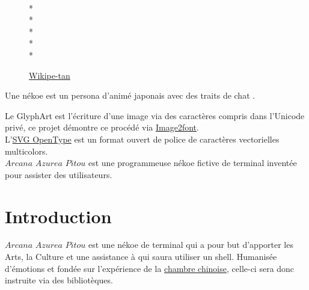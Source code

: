 \documentclass{report}
\newcommand{\name}{\textit{Arcana Azurea Pitou}}
\begin{document}
\begin{figure}[!ht]
  \begin{minipage}{1in}
    \centering
    \fontsize{30pt}{7pt}\selectfont
    \\*
    \\*
    \\*
    \\*
    \\*
  \end{minipage}
  \caption[Caption for LOF]{\href{https://en.wikipedia.org/wiki/Wikipedia:Wikipe-tan}{Wikipe-tan} \textendash{}}
\end{figure}

Une nékoe \textendash{} est un persona d'animé japonais avec des traits de chat
 \textendash.

Le GlyphArt est l'écriture d'une image via des caractères compris dans l'Unicode privé, ce projet démontre ce procédé via
\href{https://limaconoob.github.io/Image2font}{Image2font}. \\

L'\href{https://fr.wikipedia.org/wiki/SVG_OpenType}{SVG OpenType} est un format ouvert de police de caractères vectorielles multicolors. \\

$\name$ est une programmeuse nékoe fictive de terminal inventée pour assister des utilisateurs. \\

\section{Introduction}
\thispagestyle{empty}
$\name$ est une nékoe de terminal qui a pour but d'apporter les Arts, la Culture et une assistance à qui saura utiliser un shell.
Humanisée d’émotions et fondée sur l'expérience de la \href{https://fr.wikipedia.org/wiki/Chambre_chinoise}{chambre chinoise}, celle-ci sera donc instruite via des bibliotèques.
\end{document}
